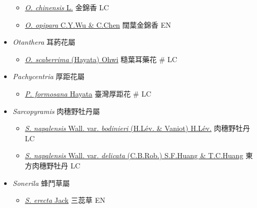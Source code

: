 \begin{itemize}
  \begin{itemize}
        \item[] \href{http://www.theplantlist.org/tpl1.1/search?q=Osbeckia+chinensis}{\textit{O. chinensis} L.}   金錦香   LC
        \item[] \href{http://www.theplantlist.org/tpl1.1/search?q=Osbeckia+opipara}{\textit{O. opipara} C.Y.Wu \& C.Chen}   闊葉金錦香   EN
  \end{itemize}
 \item[] \textit{Otanthera} 耳葯花屬
                                
  \begin{itemize}
        \item[] \href{http://www.theplantlist.org/tpl1.1/search?q=Otanthera+scaberrima}{\textit{O. scaberrima} (Hayata) Ohwi}   糙葉耳藥花  \# LC
  \end{itemize}
 \item[] \textit{Pachycentria} 厚距花屬
                                
  \begin{itemize}
        \item[] \href{http://www.theplantlist.org/tpl1.1/search?q=Pachycentria+formosana}{\textit{P. formosana} Hayata}   臺灣厚距花  \# LC
  \end{itemize}
 \item[] \textit{Sarcopyramis} 肉穗野牡丹屬
                                
  \begin{itemize}
        \item[] \href{http://www.theplantlist.org/tpl1.1/search?q=Sarcopyramis+napalensis+var.+bodinieri}{\textit{S. napalensis} Wall. var. \textit{bodinieri} (H.Lév. \& Vaniot) H.Lév.}   肉穗野牡丹   LC
        \item[] \href{http://www.theplantlist.org/tpl1.1/search?q=Sarcopyramis+napalensis+var.+delicata}{\textit{S. napalensis} Wall. var. \textit{delicata} (C.B.Rob.) S.F.Huang \& T.C.Huang}   東方肉穗野牡丹   LC
  \end{itemize}
 \item[] \textit{Sonerila} 蜂鬥草屬
                                
  \begin{itemize}
        \item[] \href{http://www.theplantlist.org/tpl1.1/search?q=Sonerila+erecta}{\textit{S. erecta} Jack}   三蕊草   EN
  \end{itemize}
  \end{itemize}
